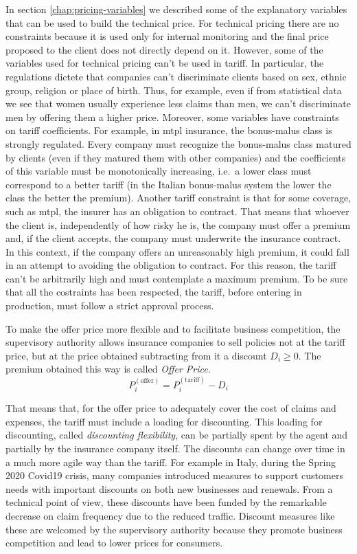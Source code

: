 \documentclass[a4paper, twoside, openright, 12pt]{report}
\theoremstyle{definition}
\theoremstyle{definition}
\theoremstyle{definition}
\theoremstyle{remark}
\begin{document}
In section \ref{chap:pricing-variables} we described some of the explanatory variables that can be used to build the technical price. For technical pricing there are no constraints because it is used only for internal monitoring and the final price proposed to the client does not directly depend on it. However, some of the variables used for technical pricing can't be used in tariff. In particular, the regulations dictete that companies can't discriminate clients based on sex, ethnic group, religion or place of birth. Thus, for example, even if from statistical data we see that women usually experience less claims than men, we can't discriminate men by offering them a higher price. Moreover, some variables have constraints on tariff coefficients. For example, in \ac{mtpl} insurance, the bonus-malus class is strongly regulated. Every company must recognize the bonus-malus class matured by clients (even if they matured them with other companies) and the coefficients of this variable must be monotonically increasing, i.e.~a lower class must correspond to a better tariff (in the Italian bonus-malus system the lower the class the better the premium). Another tariff constraint is that for some coverage, such as \ac{mtpl}, the insurer has an obligation to contract. That means that whoever the client is, independently of how risky he is, the company must offer a premium and, if the client accepts, the company must underwrite the insurance contract. In this context, if the company offers an unreasonably high premium, it could fall in an attempt to avoiding the obligation to contract. For this reason, the tariff can't be arbitrarily high and must contemplate a maximum premium. To be sure that all the costraints has been respected, the tariff, before entering in production, must follow a strict approval process.

To make the offer price more flexible and to facilitate business competition, the supervisory authority allows insurance companies to sell policies not at the tariff price, but at the price obtained subtracting from it a discount \(D_i\ge0\). The premium obtained this way is called \emph{Offer Price}.
\[
P^{(\text{offer})}_i = P^{(\text{tariff})}_i - D_i
\]

That means that, for the offer price to adequately cover the cost of claims and expenses, the tariff must include a loading for discounting. This loading for discounting, called \emph{discounting flexibility}, can be partially spent by the agent and partially by the insurance company itself. The discounts can change over time in a much more agile way than the tariff. For example in Italy, during the Spring 2020 Covid19 crisis, many companies introduced measures to support customers needs with important discounts on both new businesses and renewals. From a technical point of view, these discounts have been funded by the remarkable decrease on claim frequency due to the reduced traffic. Discount measures like these are welcomed by the supervisory authority because they promote business competition and lead to lower prices for consumers.
\end{document}
